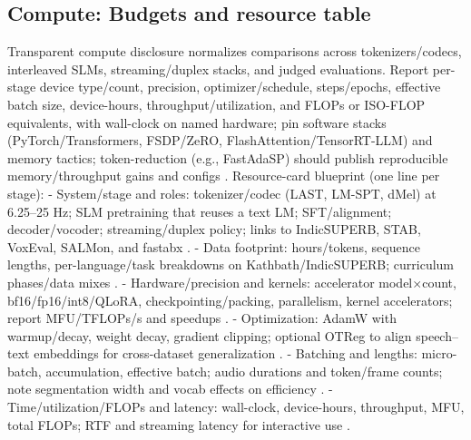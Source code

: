 \documentclass{article}
\begin{document}
\subsection{Compute: Budgets and resource table} \label{subsec:compute:budgetsandresourcetable}
Transparent compute disclosure normalizes comparisons across tokenizers/codecs, interleaved SLMs, streaming/duplex stacks, and judged evaluations. Report per-stage device type/count, precision, optimizer/schedule, steps/epochs, effective batch size, device-hours, throughput/utilization, and FLOPs or ISO-FLOP equivalents, with wall-clock on named hardware; pin software stacks (PyTorch/Transformers, FSDP/ZeRO, FlashAttention/TensorRT-LLM) and memory tactics; token-reduction (e.g., FastAdaSP) should publish reproducible memory/throughput gains and configs \cite{maimon2025slammingtrainingspeechlanguagemodelonegp,chen2023reducingbarriersselfsupervisedlearninghu,lu2024fastadaspmultitaskadaptedefficientinfere}. Resource-card blueprint (one line per stage):
- System/stage and roles: tokenizer/codec (LAST, LM-SPT, dMel) at 6.25--25 Hz; SLM pretraining that reuses a text LM; SFT/alignment; decoder/vocoder; streaming/duplex policy; links to IndicSUPERB, STAB, VoxEval, SALMon, and fastabx \cite{turetzky2024lastlanguagemodelawarespeechtokenization,jo2025lmsptalignedsemanticdistillationspeechto,bai2025dmelspeechtokenizationmadesimple,vashishth2024stabspeechtokenizerassessmentbenchmark,cui2025voxevalbenchmarkingknowledgeunderstandin,maimon2025salmonsuiteacousticlanguagemodelevaluati,poli2025fastabxlibraryefficientcomputationabxdis}.
- Data footprint: hours/tokens, sequence lengths, per-language/task breakdowns on Kathbath/IndicSUPERB; curriculum phases/data mixes \cite{entry2025indicsuperbspeechprocessinguniversalperf}.
- Hardware/precision and kernels: accelerator model$\times$count, bf16/fp16/int8/QLoRA, checkpointing/packing, parallelism, kernel accelerators; report MFU/TFLOPs/s and speedups \cite{maimon2025scalinganalysisinterleavedspeechtextlang,lu2024fastadaspmultitaskadaptedefficientinfere}.
- Optimization: AdamW with warmup/decay, weight decay, gradient clipping; optional OTReg to align speech--text embeddings for cross-dataset generalization \cite{xu2025optimaltransportregularizationspeechtext}.
- Batching and lengths: micro-batch, accumulation, effective batch; audio durations and token/frame counts; note segmentation width and vocab effects on efficiency \cite{turetzky2024lastlanguagemodelawarespeechtokenization}.
- Time/utilization/FLOPs and latency: wall-clock, device-hours, throughput, MFU, total FLOPs; RTF and streaming latency for interactive use \cite{maimon2025slammingtrainingspeechlanguagemodelonegp,entry2025indicsuperbspeechprocessinguniversalperf}.
\end{document}
